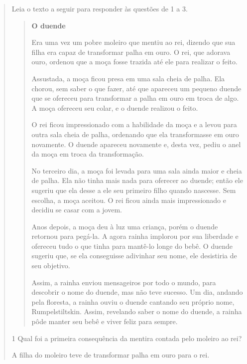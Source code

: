 \begin{quote}

Leia o texto a seguir para responder às questões de 1 a 3.

\begin{quote}
\textbf{O duende}

Era uma vez um pobre moleiro que mentiu ao rei, dizendo que sua filha
era capaz de transformar palha em ouro. O rei, que adorava ouro, ordenou
que a moça fosse trazida até ele para realizar o feito.

Assustada, a moça ficou presa em uma sala cheia de palha. Ela chorou,
sem saber o que fazer, até que apareceu um pequeno duende que se
ofereceu para transformar a palha em ouro em troca de algo. A moça
ofereceu seu colar, e o duende realizou o feito.

O rei ficou impressionado com a habilidade da moça e a levou para outra
sala cheia de palha, ordenando que ela transformasse em ouro novamente.
O duende apareceu novamente e, desta vez, pediu o anel da moça em troca
da transformação.

No terceiro dia, a moça foi levada para uma sala ainda maior e cheia de
palha. Ela não tinha mais nada para oferecer ao duende; então ele
sugeriu que ela desse a ele seu primeiro filho quando nascesse. Sem
escolha, a moça aceitou. O rei ficou ainda mais impressionado e decidiu
se casar com a jovem.

Anos depois, a moça deu à luz uma criança, porém o duende retornou para
pegá-la. A agora rainha implorou por sua liberdade e ofereceu tudo o que
tinha para mantê-lo longe do bebê. O duende sugeriu que, se ela
conseguisse adivinhar seu nome, ele desistiria de seu objetivo.

Assim, a rainha enviou mensageiros por todo o mundo, para descobrir o
nome do duende, mas não teve sucesso. Um dia, andando pela floresta, a
rainha ouviu o duende cantando seu próprio nome, Rumpelstiltskin. Assim,
revelando saber o nome do duende, a rainha pôde manter seu bebê e viver
feliz para sempre.

\end{quote}

\num{1} Qual foi a primeira consequência da mentira contada pelo moleiro ao rei?

\begin{escolha}
\item A filha do moleiro teve de transformar palha em ouro para o rei.


\end{escolha}
\end{quote}
